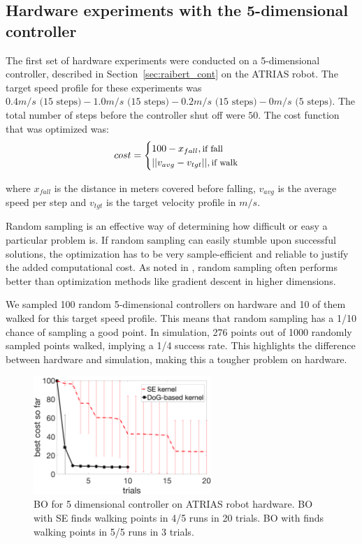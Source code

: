 \subsection{Hardware experiments with the 5-dimensional controller}
\label{sec:hdw_5d}
The first set of hardware experiments were conducted on a 5-dimensional controller, described in Section~\ref{sec:raibert_cont} on the ATRIAS robot. The target speed profile for these experiments was $0.4 m/s \text{ (15 steps)} - 1.0 m/s \text{ (15 steps)} - 0.2 m/s \text{ (15 steps)} - 0 m/s \text{ (5 steps)}$. The total number of steps before the controller shut off were $50$. The cost function that was optimized was:
\begin{equation}
    \label{eq:hdw_cost}
    cost = 
    \begin{cases}
		100 - x_{fall} , \text{\small{if fall}} \\
		||v_{avg} - v_{tgt}||, \text{\small{if walk}}\\
	\end{cases}
\end{equation}

where $x_{fall}$ is the distance in meters covered before falling, $v_{avg}$ is the average speed per step and $v_{tgt}$ is the target velocity profile in $m/s$. 

Random sampling is an effective way of determining how difficult or easy a particular problem is. If random sampling can easily stumble upon successful solutions, the optimization has to be very sample-efficient and reliable to justify the added computational cost. As noted in \cite{calandra2016bayesian}, random sampling often performs better than optimization methods like gradient descent in higher dimensions. 

We sampled 100 random 5-dimensional controllers on hardware and 10 of them walked for this target speed profile. This means that random sampling has a 1/10 chance of sampling a good point. In simulation, 276 points out of 1000 randomly sampled points walked, implying a 1/4 success rate. This highlights the difference between hardware and simulation, making this a tougher problem on hardware.

\begin{figure}[t]
\centering
\includegraphics[width=0.6\textwidth]{img/hw_raibert_5d.png}
\caption{\small{BO for 5 dimensional controller on ATRIAS robot hardware. BO with SE finds walking points in 4/5 runs in 20 trials. BO with \dogkernel finds walking points in 5/5 runs in 3 trials.}}
\label{fig:hw_raibert_5d}
\end{figure}


